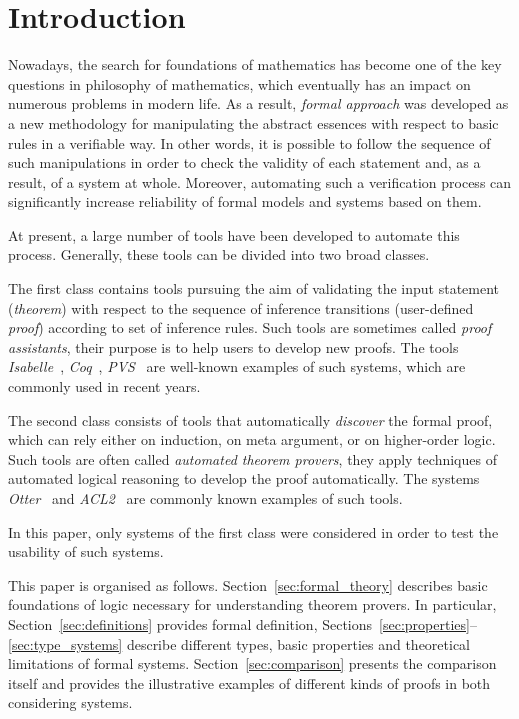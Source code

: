 \documentclass[article]{aaltoseries}
\begin{document}
\section{Introduction}
\label{sec:introduction}

Nowadays, the search for foundations of mathematics has become one of the key questions in philosophy of mathematics, which eventually has an impact on numerous problems in modern life. As a result, \textit{formal approach} was developed as a new methodology for manipulating the abstract essences with respect to basic rules in a verifiable way. In other words, it is possible to follow the sequence of such manipulations in order to check the validity of each statement and, as a result, of a system at whole. Moreover, automating such a verification process can significantly increase reliability of formal models and systems based on them.

At present, a large number of tools have been developed to automate this process. Generally, these tools can be divided into two broad classes. 

The first class contains tools pursuing the aim of validating the input statement (\textit{theorem}) with respect to the sequence of inference transitions (user-defined \textit{proof}) according to set of inference rules. Such tools are sometimes called \textit{proof assistants}, their purpose is to help users to develop new proofs. The tools \textit{Isabelle}~\cite{tool_Isabelle}, \textit{Coq}~\cite{tool_Coq}, \textit{PVS}~\cite{tool_Pvs} are well-known examples of such systems, which are commonly used in recent years.

The second class consists of tools that automatically \textit{discover} the formal proof, which can rely either on induction, on meta argument, or on higher-order logic. Such tools are often called \textit{automated theorem provers}, they apply techniques of automated logical reasoning to develop the proof automatically. The systems \textit{Otter}~\cite{tool_Otter} and \textit{ACL2}~\cite{tool_Acl} are commonly known examples of such tools.

In this paper, only systems of the first class were considered in order to test the usability of such systems.

This paper is organised as follows. Section~\ref{sec:formal_theory} describes basic foundations of logic necessary for understanding theorem provers. In particular, Section~\ref{sec:definitions} provides formal definition, Sections~\ref{sec:properties}--\ref{sec:type_systems} describe different types, basic properties and theoretical limitations of formal systems.
Section~\ref{sec:comparison} presents the comparison itself and provides the illustrative examples of different kinds of proofs in both considering systems.
\end{document}
